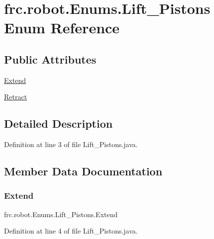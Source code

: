 \hypertarget{enumfrc_1_1robot_1_1Enums_1_1Lift__Pistons}{}\section{frc.\+robot.\+Enums.\+Lift\+\_\+\+Pistons Enum Reference}
\label{enumfrc_1_1robot_1_1Enums_1_1Lift__Pistons}
\subsection*{Public Attributes}
\begin{DoxyCompactItemize}
\item 
\hyperlink{enumfrc_1_1robot_1_1Enums_1_1Lift__Pistons_a6330e41bb1e82289bb679d21e466cb04}{Extend}
\item 
\hyperlink{enumfrc_1_1robot_1_1Enums_1_1Lift__Pistons_a95ac3a721cf39027b6e0bd0ea87f2a13}{Retract}
\end{DoxyCompactItemize}


\subsection{Detailed Description}


Definition at line 3 of file Lift\+\_\+\+Pistons.\+java.



\subsection{Member Data Documentation}
\mbox{\label{enumfrc_1_1robot_1_1Enums_1_1Lift__Pistons_a6330e41bb1e82289bb679d21e466cb04}} 
\subsubsection{\texorpdfstring{Extend}{Extend}}
{\footnotesize\ttfamily frc.\+robot.\+Enums.\+Lift\+\_\+\+Pistons.\+Extend}



Definition at line 4 of file Lift\+\_\+\+Pistons.\+java.

\mbox{\label{enumfrc_1_1robot_1_1Enums_1_1Lift__Pistons_a95ac3a721cf39027b6e0bd0ea87f2a13}} 
